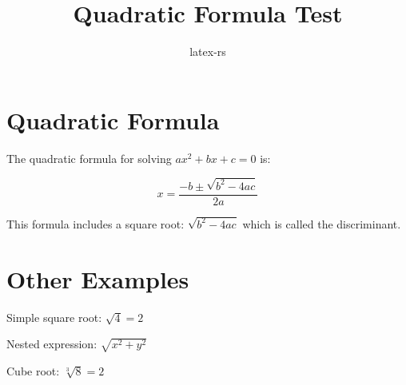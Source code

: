 \documentclass{article}
\title{Quadratic Formula Test}
\author{latex-rs}
\begin{document}
\maketitle

\section{Quadratic Formula}

The quadratic formula for solving $ax^2 + bx + c = 0$ is:

\begin{equation}
    x = \frac{-b \pm \sqrt{b^2 - 4ac}}{2a}
\end{equation}

This formula includes a square root: $\sqrt{b^2 - 4ac}$ which is called the discriminant.

\section{Other Examples}

Simple square root: $\sqrt{4} = 2$

Nested expression: $\sqrt{x^2 + y^2}$

Cube root: $\sqrt[3]{8} = 2$
\end{document}
